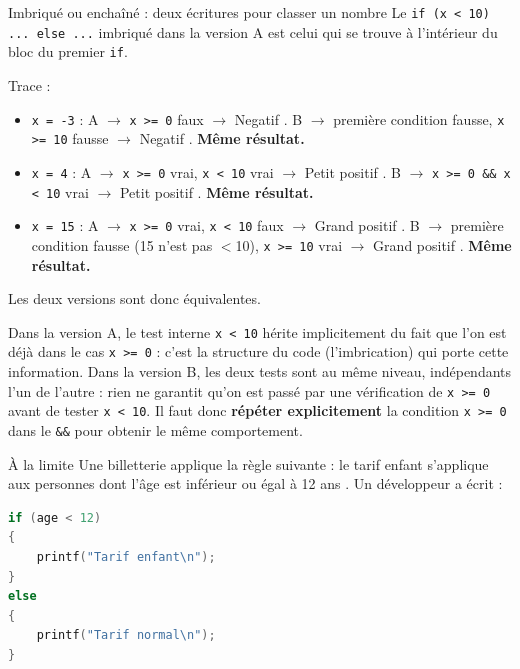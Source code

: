 \begin{UPSTIprofOnlyEnv}
    \begin{UPSTIcorrectionP}{Imbriqué ou enchaîné : deux écritures pour classer un nombre}
        Le \texttt{if (x < 10) ... else ...} imbriqué dans la version A est celui qui se trouve à l'intérieur du bloc du premier \texttt{if}.

        Trace :
        \begin{itemize}
            \item \texttt{x = -3} : A $\to$ \texttt{x >= 0} faux $\to$ \og Negatif \fg. B $\to$ première condition fausse, \texttt{x >= 10} fausse $\to$ \og Negatif \fg. \textbf{Même résultat.}
            \item \texttt{x = 4} : A $\to$ \texttt{x >= 0} vrai, \texttt{x < 10} vrai $\to$ \og Petit positif \fg. B $\to$ \texttt{x >= 0 \&\& x < 10} vrai $\to$ \og Petit positif \fg. \textbf{Même résultat.}
            \item \texttt{x = 15} : A $\to$ \texttt{x >= 0} vrai, \texttt{x < 10} faux $\to$ \og Grand positif \fg. B $\to$ première condition fausse (15 n'est pas $<$10), \texttt{x >= 10} vrai $\to$ \og Grand positif \fg. \textbf{Même résultat.}
        \end{itemize}
        Les deux versions sont donc équivalentes.

        Dans la version A, le test interne \texttt{x < 10} hérite implicitement du fait que l'on est déjà dans le cas \texttt{x >= 0} : c'est la structure du code (l'imbrication) qui porte cette information. Dans la version B, les deux tests sont au même niveau, indépendants l'un de l'autre : rien ne garantit qu'on est passé par une vérification de \texttt{x >= 0} avant de tester \texttt{x < 10}. Il faut donc \textbf{répéter explicitement} la condition \texttt{x >= 0} dans le \texttt{\&\&} pour obtenir le même comportement.
    \end{UPSTIcorrectionP}
\end{UPSTIprofOnlyEnv}


\begin{UPSTIexercice}{À la limite}
    Une billetterie applique la règle suivante : \og le tarif enfant s'applique aux personnes dont l'âge est inférieur ou égal à 12 ans \fg. Un développeur a écrit :
    \begin{lstlisting}[language=C]
if (age < 12)
{
    printf("Tarif enfant\n");
}
else
{
    printf("Tarif normal\n");
}
    \end{lstlisting}
\end{UPSTIexercice}

